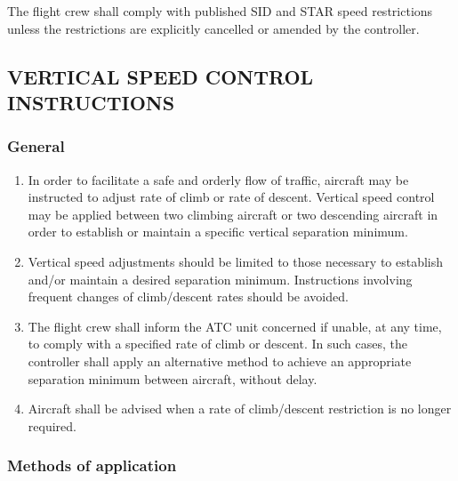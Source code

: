 \documentclass[../vATM.tex]{subfiles}
\begin{document}
    The flight crew shall comply with published SID and STAR speed restrictions unless the restrictions are explicitly cancelled or amended by the controller.



    \subsection[Vertical speed control instructions]{VERTICAL SPEED CONTROL INSTRUCTIONS}

    \subsubsection{General}

    \begin{enumerate}
        \item In order to facilitate a safe and orderly flow of traffic, aircraft may be instructed to adjust rate of climb or rate of descent. Vertical speed control may be applied between two climbing aircraft or two descending aircraft in order to establish or maintain a specific vertical separation minimum.
        \item Vertical speed adjustments should be limited to those necessary to establish and/or maintain a desired separation minimum. Instructions involving frequent changes of climb/descent rates should be avoided.
        \item The flight crew shall inform the ATC unit concerned if unable, at any time, to comply with a specified rate of climb or descent. In such cases, the controller shall apply an alternative method to achieve an appropriate separation minimum between aircraft, without delay.
        \item Aircraft shall be advised when a rate of climb/descent restriction is no longer required.
    \end{enumerate}

    \subsubsection{Methods of application}
\end{document}
